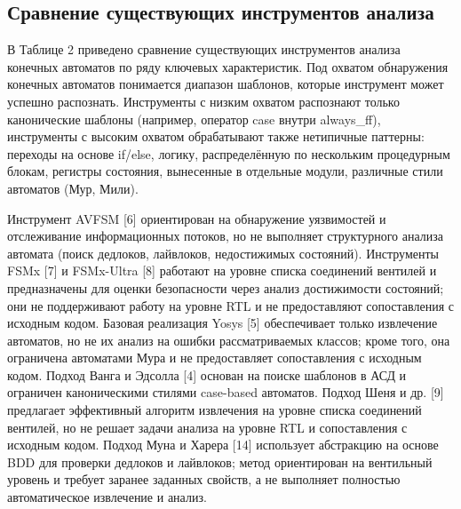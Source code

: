 \subsection{Сравнение существующих инструментов анализа}

В Таблице 2 приведено сравнение существующих инструментов анализа конечных автоматов
по ряду ключевых характеристик. Под охватом обнаружения конечных автоматов понимается
диапазон шаблонов, которые инструмент может успешно распознать. Инструменты с низким охватом
распознают только канонические шаблоны (например, оператор case внутри always\_ff),
инструменты с высоким охватом обрабатывают также нетипичные паттерны: переходы на основе
if/else, логику, распределённую по нескольким процедурным блокам, регистры состояния,
вынесенные в отдельные модули, различные стили автоматов (Мур, Мили).

Инструмент AVFSM [6] ориентирован на обнаружение уязвимостей и отслеживание информационных
потоков, но не выполняет структурного анализа автомата (поиск дедлоков, лайвлоков,
недостижимых состояний). Инструменты FSMx [7] и FSMx-Ultra [8] работают на уровне
списка соединений вентилей и предназначены для оценки безопасности через анализ
достижимости состояний; они не поддерживают работу на уровне RTL и не предоставляют сопоставления
с исходным кодом. Базовая реализация Yosys [5] обеспечивает только извлечение автоматов,
но не их анализ на ошибки рассматриваемых классов; кроме того, она ограничена автоматами
Мура и не предоставляет сопоставления с исходным кодом.
Подход Ванга и Эдсолла [4] основан на поиске шаблонов в АСД и ограничен каноническими стилями
case-based автоматов. Подход Шеня и др. [9] предлагает эффективный алгоритм извлечения
на уровне списка соединений вентилей, но не решает задачи анализа на уровне RTL и сопоставления
с исходным кодом. Подход Муна и Харера [14] использует абстракцию на основе BDD для проверки
дедлоков и лайвлоков; метод ориентирован на вентильный уровень и требует заранее заданных
свойств, а не выполняет полностью автоматическое извлечение и анализ.

